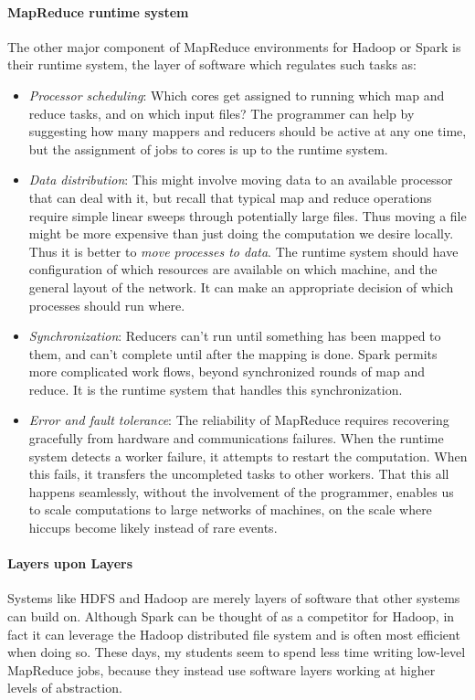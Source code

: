 \documentclass[10pt]{article}
\begin{document}
\begin{enumerate}
\paragraph{MapReduce runtime system}
The other major component of MapReduce environments for Hadoop or Spark is their runtime system, the layer of software which regulates such tasks as:

\begin{itemize}
  \item \textit{Processor scheduling}: Which cores get assigned to running which map and reduce tasks, and on which input files? The programmer can help by suggesting how many mappers and reducers should be active at any one time, but the assignment of jobs to cores is up to the runtime system.
  \item \textit{Data distribution}: This might involve moving data to an available processor that can deal with it, but recall that typical map and reduce operations require simple linear sweeps through potentially large files. Thus moving a file might be more expensive than just doing the computation we desire locally.\\
Thus it is better to \textit{move processes to data}. The runtime system should have configuration of which resources are available on which machine, and the general layout of the network. It can make an appropriate decision of which processes should run where.
  \item \textit{Synchronization}: Reducers can't run until something has been mapped to them, and can't complete until after the mapping is done. Spark permits more complicated work flows, beyond synchronized rounds of map and reduce. It is the runtime system that handles this synchronization.
  \item \textit{Error and fault tolerance}: The reliability of MapReduce requires recovering gracefully from hardware and communications failures. When the runtime system detects a worker failure, it attempts to restart the computation. When this fails, it transfers the uncompleted tasks to other workers. That this all happens seamlessly, without the involvement of the programmer, enables us to scale computations to large networks of machines, on the scale where hiccups become likely instead of rare events.
\end{itemize}

\paragraph{Layers upon Layers}
Systems like HDFS and Hadoop are merely layers of software that other systems can build on. Although Spark can be thought of as a competitor for Hadoop, in fact it can leverage the Hadoop distributed file system and is often most efficient when doing so. These days, my students seem to spend less time writing low-level MapReduce jobs, because they instead use software layers working at higher levels of abstraction.


\end{enumerate}
\end{document}
